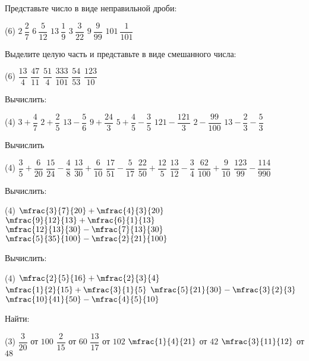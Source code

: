 %
%
\begin{class}[number=5]
	\begin{listofex}
		\item Представьте число в виде неправильной дроби:
		\begin{tasks}(6)
			\task \( 2\:\dfrac{2}{7} \)
			\task \( 6\:\dfrac{5}{12} \)
			\task \( 13\:\dfrac{1}{9} \)
			\task \( 3\:\dfrac{3}{22} \)
			\task \( 9\:\dfrac{9}{99} \)
			\task \( 101\:\dfrac{1}{101} \)
		\end{tasks}
		\item Выделите целую часть и представьте в виде смешанного числа:
		\begin{tasks}(6)
			\task \( \dfrac{13}{4} \)
			\task \( \dfrac{47}{11} \)
			\task \( \dfrac{51}{4} \)
			\task \( \dfrac{333}{101} \)
			\task \( \dfrac{54}{53} \)
			\task \( \dfrac{123}{10} \)
		\end{tasks}
		\item Вычислить:
		\begin{tasks}(4)
			\task \( 3+\dfrac{4}{7} \)
			\task \( 2+\dfrac{2}{5} \)
			\task \( 13-\dfrac{5}{6} \)
			\task \( 9+\dfrac{24}{3} \)
			\task \( 5+\dfrac{4}{5}-\dfrac{3}{5} \)
			\task \( 121-\dfrac{121}{3} \)
			\task \( 2-\dfrac{99}{100} \)
			\task \( 13-\dfrac{2}{3}-\dfrac{5}{3} \)
		\end{tasks}
		\item Вычислить
		\begin{tasks}(4)
			\task \( \dfrac{3}{5}+\dfrac{6}{20} \)
			\task \( \dfrac{15}{24}-\dfrac{4}{8} \)
			\task \( \dfrac{13}{30}+\dfrac{6}{10} \)
			\task \( \dfrac{17}{51}-\dfrac{5}{17} \)
			\task \( \dfrac{22}{50}+\dfrac{12}{5} \)
			\task \( \dfrac{13}{12}-\dfrac{3}{4} \)
			\task \( \dfrac{62}{100}+\dfrac{9}{10} \)
			\task \( \dfrac{123}{99}-\dfrac{114}{990} \)
		\end{tasks}
		\item Вычислить:
		\begin{tasks}(4)
			\task \( \mfrac{3}{7}{20}+\mfrac{4}{3}{20} \)
			\task \( \mfrac{9}{12}{13}+\mfrac{6}{1}{13} \)
			\task \( \mfrac{12}{13}{30}-\mfrac{7}{13}{30} \)
			\task \( \mfrac{5}{35}{100}-\mfrac{2}{21}{100} \)
		\end{tasks}
		\item Вычислить:
		\begin{tasks}(4)
			\task \( \mfrac{2}{5}{16}+\mfrac{2}{3}{4} \)
			\task \( \mfrac{1}{2}{15}+\mfrac{3}{1}{5} \)
			\task \( \mfrac{5}{21}{30}-\mfrac{3}{2}{3} \)
			\task \( \mfrac{10}{41}{50}-\mfrac{4}{5}{10} \)
		\end{tasks}
		\item Найти:
		\begin{tasks}(3)
			\task \( \dfrac{3}{20} \) от \( 100 \)
			\task \( \dfrac{2}{15} \) от \( 60 \)
			\task \( \dfrac{13}{17} \) от \( 102 \)
			\task \( \mfrac{1}{4}{21} \) от \( 42 \)
			\task \( \mfrac{3}{11}{12} \) от \( 48 \)
		\end{tasks}
	\end{listofex}
\end{class}


